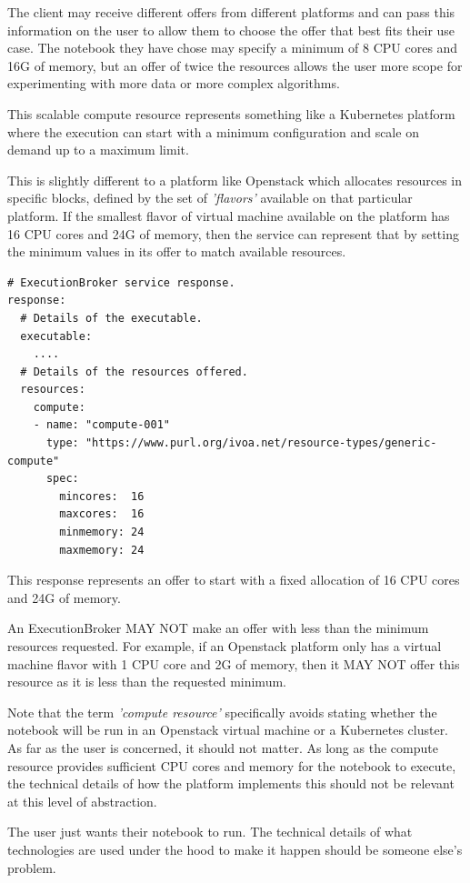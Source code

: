 \documentclass[11pt,a4paper]{ivoa}
\newcommand{\execbrokerclass} {ExecutionBroker}
\newcommand{\openstack} {Openstack}
\newcommand{\kubernetes} {Kubernetes}
\newcommand{\cpu} {CPU}
\newcommand{\scalable} {scalable}
\begin{document}
The client may receive different offers from different platforms and can pass this information
on the user to allow them to choose the offer that best fits their use case.
The notebook they have chose may specify a minimum of 8 \cpu{} cores and 16G of memory,
but an offer of twice the resources allows the user more scope for experimenting with
more data or more complex algorithms.

This \scalable{} compute resource represents something like a \kubernetes{} platform where the
execution can start with a minimum configuration and scale on demand up to a maximum limit.

This is slightly different to a platform like \openstack{} which allocates resources
in specific blocks, defined by the set of \textit{'flavors'} available on that particular platform.
If the smallest flavor of virtual machine available on the platform has 16 \cpu{} cores and 24G of memory,
then the service can represent that by setting the minimum values in its offer to match available resources.

\begin{lstlisting}[]
# ExecutionBroker service response.
response:
  # Details of the executable.
  executable:
    ....
  # Details of the resources offered.
  resources:
    compute:
    - name: "compute-001"
      type: "https://www.purl.org/ivoa.net/resource-types/generic-compute"
      spec:
        mincores:  16
        maxcores:  16
        minmemory: 24
        maxmemory: 24
\end{lstlisting}

This response represents an offer to start with a fixed allocation of 16 \cpu{} cores and 24G of memory.

An \execbrokerclass{} MAY NOT make an offer with less than the minimum resources requested.
For example, if an \openstack{} platform only has a virtual machine flavor with 1 \cpu{} core and 2G of memory,
then it MAY NOT offer this resource as it is less than the requested minimum.

Note that the term \textit{'compute resource'} specifically avoids stating whether the
notebook will be run in an \openstack{} virtual machine or a \kubernetes{} cluster.
As far as the user is concerned, it should not matter. As long as the compute resource provides
sufficient \cpu{} cores and memory for the notebook to execute, the technical details of how the
platform implements this should not be relevant at this level of abstraction.

The user just wants their notebook to run. The technical details of what technologies are used
under the hood to make it happen should be someone else's problem.
\end{document}
